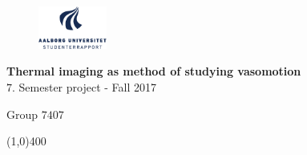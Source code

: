 \clearpage
\thispagestyle{empty}

\begin{figure}[H]
	\raggedleft
	\includegraphics[width=0.2\textwidth]{figures/aaulogo-da.png}
\end{figure} 

\vspace{5 cm}

\begin{center}	
	\begin{Huge}
		\textbf{Thermal imaging as method of studying vasomotion}\\
		\vspace{5 mm}
		$7.$ Semester project - Fall 2017\\
		\vspace{3 mm}
	\end{Huge}
	{\Large Group $7407$}
\end{center}
\vspace*{\fill}

\begin{center}
	\line(1,0){400}
\end{center}

